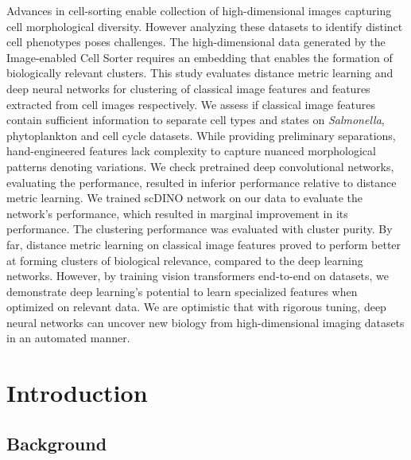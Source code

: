 \documentclass[12pt,a4paper]{article}
\begin{document}
Advances in cell-sorting enable collection of high-dimensional images capturing cell morphological diversity. However analyzing these datasets to identify distinct cell phenotypes poses challenges. The high-dimensional data generated by the Image-enabled Cell Sorter requires an embedding that enables the formation of biologically relevant clusters. This study evaluates distance metric learning and deep neural networks for clustering of classical image features and features extracted from cell images respectively. We assess if classical image features contain sufficient information to separate cell types and states on \textit{Salmonella}, phytoplankton and cell cycle datasets. While providing preliminary separations, hand-engineered features lack complexity to capture nuanced morphological patterns denoting variations. We check pretrained deep convolutional networks, evaluating the performance, resulted in inferior performance relative to distance metric learning. We trained scDINO network on our data to evaluate the network's performance, which resulted in marginal improvement in its performance. The clustering performance was evaluated with cluster purity. By far, distance metric learning on classical image features proved to perform better at forming clusters of biological relevance, compared to the deep learning networks. However, by training vision transformers end-to-end on datasets, we demonstrate deep learning's potential to learn specialized features when optimized on relevant data. We are optimistic that with rigorous tuning, deep neural networks can uncover new biology from high-dimensional imaging datasets in an automated manner.

\newpage
\section{Introduction}
\label{intro}

\subsection{Background}
\end{document}
